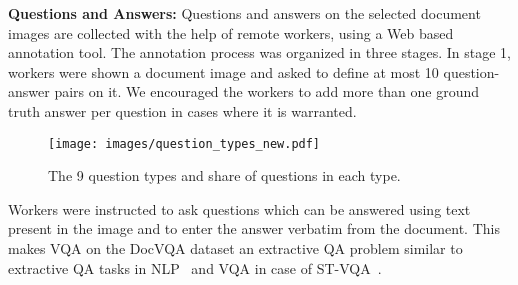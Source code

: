 \documentclass[10pt,twocolumn,letterpaper]{article}
\newcommand{\datasetName}{DocVQA\xspace}
\newcommand{\stvqa}{ST-VQA\xspace}
\begin{document}
\textbf{Questions and Answers:} Questions and answers on the selected document images are collected with the help of remote workers, using a Web based annotation tool. 
The annotation process was organized in three stages. In stage 1, workers were shown a document image and asked to define at most 10 question-answer pairs on it. 
We encouraged the workers to add more than one ground truth answer per question in cases where it is warranted.
\begin{figure}[b]
    \centering
    \texttt{[image: images/question\_types\_new.pdf]}
    \caption{The 9 question types and share of questions in each type.}
    \label{fig:question_types}
\end{figure}
Workers were instructed to ask questions which can be answered using text present in the image and to enter the answer verbatim from the document. This makes VQA on the \datasetName dataset an extractive QA problem similar to extractive QA tasks in NLP~\cite{squad,newsqa} and VQA in case of \stvqa~\cite{stvqa_iccv}. 
\end{document}
